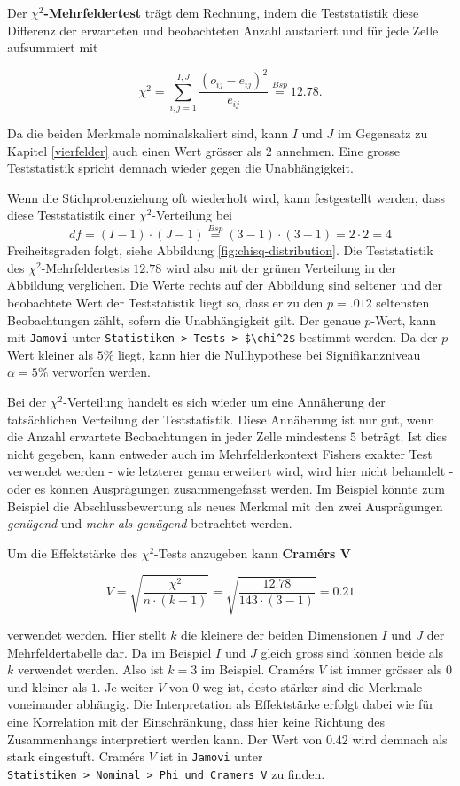 \documentclass[
]{book}
\theoremstyle{definition}
\theoremstyle{definition}
\theoremstyle{definition}
\theoremstyle{definition}
\theoremstyle{remark}
\begin{document}
Der \label{customdef-mehrfeldertest}{\textbf{\(\chi^2\)-Mehrfeldertest}} trägt dem Rechnung, indem die Teststatistik diese Differenz der erwarteten und beobachteten Anzahl austariert und für jede Zelle aufsummiert mit

\[\chi^2 = \sum_{i,j = 1}^{I,J} \frac{(o_{ij} - e_{ij})^2}{e_{ij}} \overset{Bsp}{=}  12.78.\]

Da die beiden Merkmale nominalskaliert sind, kann \(I\) und \(J\) im Gegensatz zu Kapitel \ref{vierfelder} auch einen Wert grösser als \(2\) annehmen. Eine grosse Teststatistik spricht demnach wieder gegen die Unabhängigkeit.

Wenn die Stichprobenziehung oft wiederholt wird, kann festgestellt
werden, dass diese Teststatistik einer \(\chi^2\)-Verteilung bei
\[df = (I-1)\cdot (J-1) \overset{Bsp}{=} (3-1)\cdot (3-1) = 2\cdot 2 = 4\]
Freiheitsgraden folgt, siehe Abbildung \ref{fig:chisq-distribution}. Die Teststatistik des \(\chi^2\)-Mehrfeldertests \(12.78\) wird also mit
der grünen Verteilung in der Abbildung verglichen. Die Werte rechts auf
der Abbildung sind seltener und der beobachtete Wert der Teststatistik liegt so, dass er zu den \(p = .012\) seltensten Beobachtungen zählt, sofern die Unabhängigkeit gilt. Der genaue \(p\)-Wert, kann mit \texttt{Jamovi} unter \texttt{Statistiken\ \textgreater{}\ Tests\ \textgreater{}\ \$\textbackslash{}chi\^{}2\$} bestimmt werden. Da der \(p\)-Wert kleiner als \(5\%\) liegt, kann hier die Nullhypothese bei Signifikanzniveau \(\alpha = 5\%\) verworfen werden.

Bei der \(\chi^2\)-Verteilung handelt es sich wieder um eine Annäherung der tatsächlichen Verteilung der Teststatistik. Diese Annäherung ist nur gut, wenn die Anzahl erwartete Beobachtungen in jeder Zelle mindestens \(5\) beträgt. Ist dies nicht gegeben, kann entweder auch im Mehrfelderkontext Fishers exakter Test verwendet werden - wie letzterer genau erweitert wird, wird hier nicht behandelt - oder es können Ausprägungen zusammengefasst werden. Im Beispiel könnte zum Beispiel die Abschlussbewertung als neues Merkmal mit den zwei Ausprägungen \emph{genügend} und \emph{mehr-als-genügend} betrachtet werden.

\label{customdef-cramers-v}{Um die Effektstärke des \(\chi^2\)-Tests anzugeben kann \textbf{Cramérs V}}

\[V = \sqrt{\frac{\chi^2}{n\cdot (k-1)}} = \sqrt{\frac{12.78}{143\cdot (3-1)}} = 0.21\]

verwendet werden. Hier stellt \(k\) die kleinere der beiden Dimensionen \(I\) und \(J\) der Mehrfeldertabelle dar. Da im Beispiel \(I\) und \(J\) gleich gross sind können beide als \(k\) verwendet werden. Also ist \(k = 3\) im Beispiel. Cramérs \(V\) ist immer grösser als \(0\) und kleiner als \(1\). Je weiter \(V\) von \(0\) weg ist, desto stärker sind die Merkmale voneinander abhängig. Die Interpretation als Effektstärke erfolgt dabei wie für eine Korrelation mit der Einschränkung, dass hier keine Richtung des Zusammenhangs interpretiert werden kann. Der Wert von \(0.42\) wird demnach als stark eingestuft. Cramérs \(V\) ist in \texttt{Jamovi} unter \texttt{Statistiken\ \textgreater{}\ Nominal\ \textgreater{}\ Phi\ und\ Cramer\textquotesingle{}s\ V} zu finden.
\end{document}
